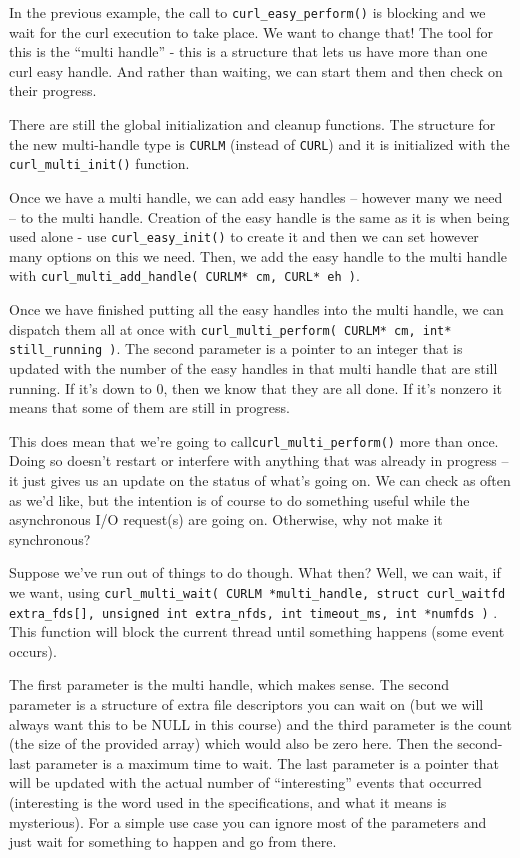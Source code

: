 \documentclass[a4paper]{report}
\begin{document}
In the previous example, the call to \texttt{curl\_easy\_perform()} is blocking and we wait for the curl execution to take place. We want to change that! The tool for this is the ``multi handle'' - this is a structure that lets us have more than one curl easy handle. And rather than waiting, we can start them and then check on their progress. 

There are still the global initialization and cleanup functions. The structure for the new multi-handle type is \texttt{CURLM} (instead of \texttt{CURL}) and it is initialized with the \texttt{curl\_multi\_init()} function. 

Once we have a multi handle, we can add easy handles -- however many we need -- to the multi handle. Creation of the easy handle is the same as it is when being used alone - use \texttt{curl\_easy\_init()} to create it and then we can set however many options on this we need. Then, we add the easy handle to the multi handle with \texttt{curl\_multi\_add\_handle( CURLM* cm, CURL* eh )}.

Once we have finished putting all the easy handles into the multi handle, we can dispatch them all at once with \texttt{curl\_multi\_perform( CURLM* cm, int* still\_running )}. The second parameter is a pointer to an integer that is updated with the number of the easy handles in that multi handle that are still running. If it's down to 0, then we know that they are all done. If it's nonzero it means that some of them are still in progress.

This does mean that we're going to call\texttt{curl\_multi\_perform()} more than once. Doing so doesn't restart or interfere with anything that was already in progress -- it just gives us an update on the status of what's going on. We can check as often as we'd like, but the intention is of course to do something useful while the asynchronous I/O request(s) are going on. Otherwise, why not make it synchronous?

Suppose we've run out of things to do though. What then? Well, we can wait, if we want, using \texttt{curl\_multi\_wait( CURLM *multi\_handle, struct curl\_waitfd extra\_fds[], unsigned int extra\_nfds, int timeout\_ms, int *numfds )} . This function will block the current thread until something happens (some event occurs).

The first parameter is the multi handle, which makes sense. The second parameter is a structure of extra file descriptors you can wait on (but we will always want this to be NULL in this course) and the third parameter is the count (the size of the provided array) which would also be zero here. Then the second-last parameter is a maximum time to wait. The last parameter is a pointer that will be updated with the actual number of ``interesting'' events that occurred (interesting is the word used in the specifications, and what it means is mysterious). For a simple use case you can ignore most of the parameters and just wait for something to happen and go from there.
\end{document}
